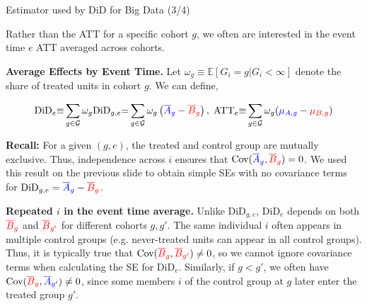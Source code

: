 \documentclass[usenames,dvipsnames]{beamer}
\begin{document}
\begin{frame}{Estimator used by DiD for Big Data (3/4)}

\vspace{-0.1cm}

Rather than the ATT for a specific cohort $g$, we often are interested in the event time $e$ ATT averaged across cohorts.

\textbf{Average Effects by Event Time.} Let  $\omega_g \equiv \mathbb{E}[G_i =g | G_i < \infty]$ denote the share of treated units in cohort $g$.  We can define,

\vspace{-0.5cm}

\begin{equation} \notag
\text{DiD}_e  {\equiv}  \sum_{g \in \mathcal{G}} \omega_g \text{DiD}_{g,e} {=}  \sum_{g \in \mathcal{G}} \omega_g \left(  {\color{blue}\overline{A}_g} - {\color{red}\overline{B}_g} \right), 
  \; \text{ATT}_e {\equiv} \sum_{g \in \mathcal{G}}  \omega_{g}  ( {\color{blue}\mu_{A,g}} - {\color{red}\mu_{B,g}} )
\end{equation} 

\vspace{-0.25cm}

\textbf{Recall:} For a given $(g,e)$, the treated and control group are mutually exclusive. Thus, independence across $i$ ensures that $\text{Cov}({\color{blue}\overline{A}_g}, {\color{red}\overline{B}_g})=0$. We used this result on the previous slide to obtain simple SEs with no covariance terms for $\text{DiD}_{g,e} = {\color{blue}\overline{A}_g} - {\color{red}\overline{B}_g} $.

\textbf{Repeated $i$ in the event time average.} Unlike $\text{DiD}_{g,e}$, $\text{DiD}_e$ depends on both ${\color{red}\overline{B}_g}$ and ${\color{red}\overline{B}_{g'}}$ for different cohorts $g,g'$. The same individual $i$ often appears in multiple control groups (e.g. never-treated units can appear in all control groups). Thus, it is typically true that $\text{Cov}({\color{red}\overline{B}_g}, {\color{red}\overline{B}_{g'}}) \neq 0$, so we cannot ignore covariance terms when calculating the SE for $\text{DiD}_e$. Similarly, if $g<g'$, we often have $\text{Cov}({\color{red}\overline{B}_g}, {\color{blue}\overline{A}_{g'}}) \neq 0$, since some members $i$ of the control group at $g$ later enter the treated group $g'$.

\end{frame}
\end{document}
